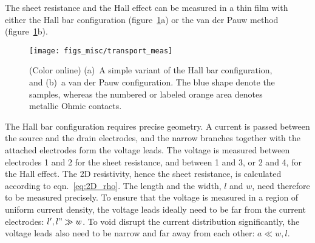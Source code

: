 The sheet resistance and the Hall effect can be measured in a thin film with either the Hall bar configuration (figure~\ref{fig:transport_meas}a) or the van der Pauw method (figure~\ref{fig:transport_meas}b).%
\begin{figure}[ht]%
	\centering%
    \texttt{[image: figs\_misc/transport\_meas]}%
    \caption[Hall bar and van der Pauw configuration]{\label{fig:transport_meas}(Color online) (a)~A simple variant of the Hall bar configuration, and (b)~a van der Pauw configuration. The blue shape denote the samples, whereas the numbered or labeled orange area denotes metallic Ohmic contacts.}%
\end{figure}%

The Hall bar configuration requires precise geometry. A current is passed between the source and the drain electrodes, and the narrow branches together with the attached electrodes form the voltage leads. The voltage is measured between electrodes 1 and 2 for the sheet resistance, and between 1 and 3, or 2 and 4, for the Hall effect. The 2D resistivity, hence the sheet resistance, is calculated according to eqn.~\ref{eq:2D_rho}. The length and the width, $l$ and $w$, need therefore to be measured precisely. To ensure that the voltage is measured in a region of uniform current density, the voltage leads ideally need to be far from the current electrodes: $l', l" \gg w$. To void disrupt the current distribution significantly, the voltage leads also need to be narrow and far away from each other: $a \ll w, l$.

